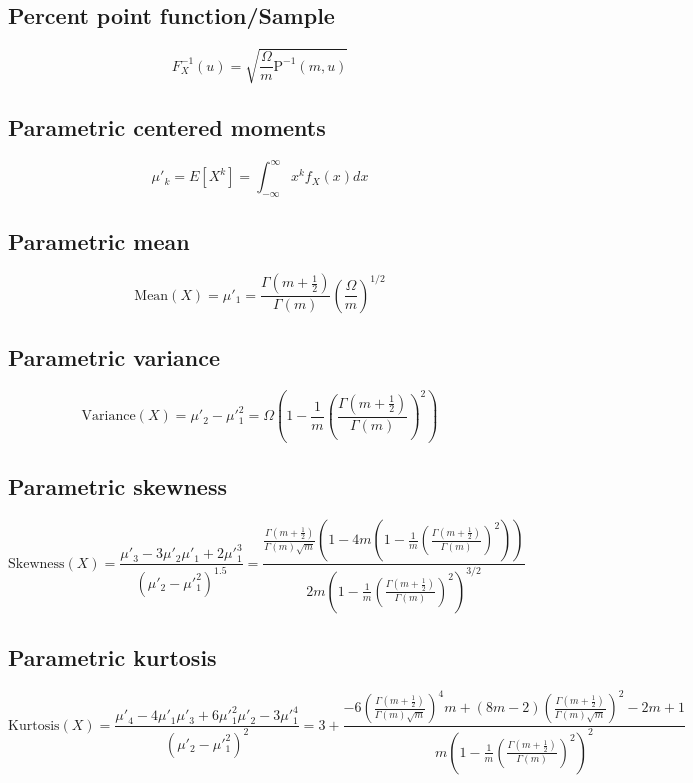 \documentclass{article}
\begin{document}
\subsection{Percent point function/Sample}
\begin{equation*} F^{-1}_{X}\left(u\right)=\sqrt{\frac{\Omega}{m}\text{P}^{-1}\left(m,u\right)} \end{equation*}
\subsection{Parametric centered moments}
\begin{equation*} \mu'_{k}=E[X^k]=\int_{-\infty }^{\infty }x^{k}f_{X}\left(x\right)dx \end{equation*}
\subsection{Parametric mean}
\begin{equation*} \mathrm{Mean}(X)=\mu'_{1}=\frac{\Gamma(m+\frac{1}{2})}{\Gamma(m)}\left(\frac{\Omega}{m}\right)^{1/2} \end{equation*}
\subsection{Parametric variance}
\begin{equation*} \mathrm{Variance}(X)=\mu'_{2}-\mu'^{2}_{1}=\Omega\left(1-\frac{1}{m}\left(\frac{\Gamma(m+\frac{1}{2})}{\Gamma(m)}\right)^2\right) \end{equation*}
\subsection{Parametric skewness}
\begin{equation*} \mathrm{Skewness}(X)=\frac{\mu'_{3}-3\mu'_{2}\mu'_{1}+2\mu'^{3}_{1}}{(\mu'_{2}-\mu'^{2}_{1})^{1.5}}=\frac{\frac{\Gamma(m+\frac{1}{2})}{\Gamma(m)\sqrt{m}}\left(1-4m\left(1-\frac{1}{m}\left(\frac{\Gamma(m+\frac{1}{2})}{\Gamma(m)}\right)^2\right)\right)}{2m\left(1-\frac{1}{m}\left(\frac{\Gamma(m+\frac{1}{2})}{\Gamma(m)}\right)^2\right)^{3/2}} \end{equation*}
\subsection{Parametric kurtosis}
\begin{equation*} \mathrm{Kurtosis}(X)=\frac{\mu'_{4}-4\mu'_{1}\mu'_{3}+6\mu'^{2}_{1}\mu'_{2}-3\mu'^{4}_{1}}{(\mu'_{2}-\mu'^{2}_{1})^{2}}=3+\frac{-6\left(\frac{\Gamma(m+\frac{1}{2})}{\Gamma(m)\sqrt{m}}\right)^{4}m+\left(8m-2\right)\left(\frac{\Gamma(m+\frac{1}{2})}{\Gamma(m)\sqrt{m}}\right)^{2}-2m+1}{m\left(1-\frac{1}{m}\left(\frac{\Gamma(m+\frac{1}{2})}{\Gamma(m)}\right)^2\right)^{2}} \end{equation*}
\end{document}
